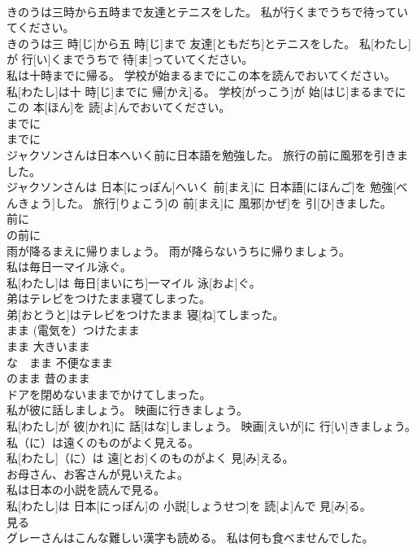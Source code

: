 \documentclass[8pt]{extreport}
\begin{document}
\begin{CJK}{UTF8}{min}
\\	きのうは三時から五時まで友達とテニスをした。 私が行くまでうちで待っていてください。	
\\	きのうは三 時[じ]から五 時[じ]まで 友達[ともだち]とテニスをした。 私[わたし]が 行[い]くまでうちで 待[ま]っていてください。	
\\	私は十時までに帰る。 学校が始まるまでにこの本を読んでおいてください。	
\\	私[わたし]は十 時[じ]までに 帰[かえ]る。 学校[がっこう]が 始[はじ]まるまでにこの 本[ほん]を 読[よ]んでおいてください。	
\\	までに 
\\	までに	
\\	ジャクソンさんは日本へいく前に日本語を勉強した。 旅行の前に風邪を引きました。	
\\	ジャクソンさんは 日本[にっぽん]へいく 前[まえ]に 日本語[にほんご]を 勉強[べんきょう]した。 旅行[りょこう]の 前[まえ]に 風邪[かぜ]を 引[ひ]きました。	
\\	前に 
\\	の前に	
\\	雨が降るまえに帰りましょう。 雨が降らないうちに帰りましょう。
\\	私は毎日一マイル泳ぐ。	
\\	私[わたし]は 毎日[まいにち]一マイル 泳[およ]ぐ。	
\\	弟はテレビをつけたまま寝てしまった。	
\\	弟[おとうと]はテレビをつけたまま 寝[ね]てしまった。	
\\	まま (電気を）つけたまま　
\\	まま 大きいまま 
\\	な　まま 不便なまま 
\\	のまま 昔のまま 
\\	ドアを閉めないままでかけてしまった。 
\\	私が彼に話しましょう。 映画に行きましょう。	
\\	私[わたし]が 彼[かれ]に 話[はな]しましょう。 映画[えいが]に 行[い]きましょう。	
\\	私（に）は遠くのものがよく見える。	
\\	私[わたし]（に）は 遠[とお]くのものがよく 見[み]える。	
\\	お母さん、お客さんが見いえたよ。 
\\	私は日本の小説を読んで見る。	
\\	私[わたし]は 日本[にっぽん]の 小説[しょうせつ]を 読[よ]んで 見[み]る。	
\\	見る	
\\	グレーさんはこんな難しい漢字も読める。 私は何も食べませんでした。	

\end{CJK}
\end{document}
